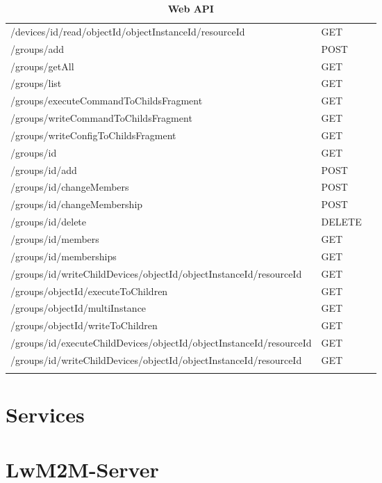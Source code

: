\begin{longtable}{ p{11cm} p{4cm} l}
/devices/{id}/read/{objectId}/{objectInstanceId}/{resourceId}	&	GET	 \\ \addlinespace
/groups/add	&	POST	 \\ \addlinespace
/groups/getAll	&	GET	 \\ \addlinespace
/groups/list	&	GET	 \\ \addlinespace
/groups/executeCommandToChildsFragment	&	GET	 \\ \addlinespace
/groups/writeCommandToChildsFragment	&	GET	 \\ \addlinespace
/groups/writeConfigToChildsFragment	&	GET	 \\ \addlinespace
/groups/{id}	&	GET	 \\ \addlinespace
/groups/{id}/add	&	POST	 \\ \addlinespace
/groups/{id}/changeMembers	&	POST	 \\ \addlinespace
/groups/{id}/changeMembership	&	POST	 \\ \addlinespace
/groups/{id}/delete	&	DELETE	 \\ \addlinespace
/groups/{id}/members	&	GET	 \\ \addlinespace
/groups/{id}/memberships	&	GET	 \\ \addlinespace
/groups/{id}/writeChildDevices/{objectId}/{objectInstanceId}/{resourceId}	&	GET	 \\ \addlinespace
/groups/{objectId}/executeToChildren	&	GET	 \\ \addlinespace
/groups/{objectId}/multiInstance	&	GET	 \\ \addlinespace
/groups/{objectId}/writeToChildren	&	GET	 \\ \addlinespace
/groups/{id}/executeChildDevices/{objectId}/{objectInstanceId}/{resourceId}	&	GET	 \\ \addlinespace
/groups/{id}/writeChildDevices/{objectId}/{objectInstanceId}/{resourceId}	&	GET	 \\ \addlinespace

\hline\caption{\textbf{Web API}}
\end{longtable}




\newpage

\section{Services}



\newpage

\section{LwM2M-Server}

